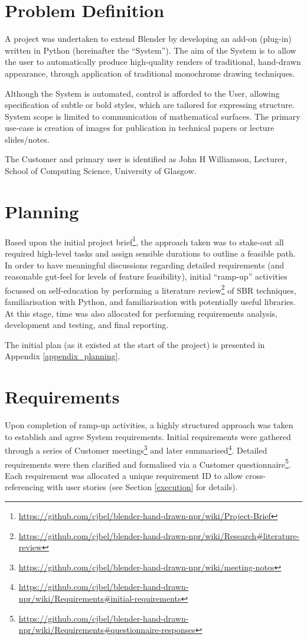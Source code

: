 \section{Problem Definition}

A project was undertaken to extend Blender by developing an add-on (plug-in) written in Python (hereinafter the ``System''). The aim of the System is to allow the user to automatically produce high-quality renders of traditional, hand-drawn appearance, through application of traditional monochrome drawing techniques.

Although the System is automated, control is afforded to the User, allowing specification of subtle or bold styles, which are tailored for expressing structure. System scope is limited to communication of mathematical surfaces. The primary use-case is creation of images for publication in technical papers or lecture slides/notes.

The Customer and primary user is identified as John H Williamson, Lecturer, School of Computing Science, University of Glasgow.

\section{Planning}

Based upon the initial project brief\footnote{\url{https://github.com/cjbel/blender-hand-drawn-npr/wiki/Project-Brief}}, the approach taken was to stake-out all required high-level tasks and assign sensible durations to outline a feasible path. 
In order to have meaningful discussions regarding detailed requirements (and reasonable gut-feel for levels of feature feasibility), initial ``ramp-up'' activities focussed on self-education by performing a literature review\footnote{\url{https://github.com/cjbel/blender-hand-drawn-npr/wiki/Research#literature-review}} of SBR techniques, familiarisation with Python, and familiarisation with potentially useful libraries.
At this stage, time was also allocated for performing requirements analysis, development and testing, and final reporting.

The initial plan (as it existed at the start of the project) is presented in Appendix \ref{appendix_planning}.

\section{Requirements}

Upon completion of ramp-up activities, a highly structured approach was taken to establish and agree System requirements.
Initial requirements were gathered through a series of Customer meetings\footnote{\url{https://github.com/cjbel/blender-hand-drawn-npr/wiki/meeting-notes}} and later summarised\footnote{\url{https://github.com/cjbel/blender-hand-drawn-npr/wiki/Requirements#initial-requirements}}.
Detailed requirements were then clarified and formalised via a Customer questionnaire\footnote{\url{https://github.com/cjbel/blender-hand-drawn-npr/wiki/Requirements#questionnaire-responses}}. Each requirement was allocated a unique requirement ID to allow cross-referencing with user stories (see Section \ref{execution} for details).

